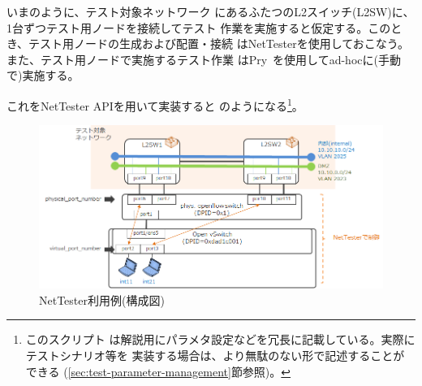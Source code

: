 いまのように、テスト対象ネットワーク
にあるふたつのL2スイッチ(L2SW)に、1台ずつテスト用ノードを接続してテスト
作業を実施すると仮定する。このとき、テスト用ノードの生成および配置・接続
はNetTesterを使用しておこなう。また、テスト用ノードで実施するテスト作業
はPry~\cite{pry}を使用してad-hocに(手動で)実施する。

これをNetTester APIを用いて実装すると
のようになる\footnote{このスクリプト
は解説用にパラメタ設定などを冗長に記載している。実際にテストシナリオ等を
実装する場合は、より無駄のない形で記述することができる
(\ref{sec:test-parameter-management}節参照)。}。

\begin{figure}[h]
 \centering
 \includegraphics[scale=0.75]{img/nettester-basic-example.png}
 \caption{NetTester利用例(構成図)}
 \label{fig:nettester-basic-example}
\end{figure}

